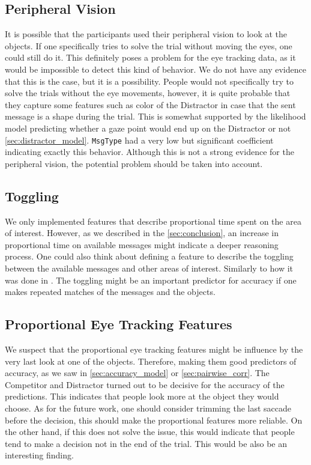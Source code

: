 \subsection{Peripheral Vision}
\label{sec:general-discussion:attention-and-eye-tracking}
It is possible that the participants used their peripheral vision to look at the objects. If one specifically tries to solve the trial without moving the eyes, one could still do it. This definitely poses a problem for the eye tracking data, as it would be impossible to detect this kind of behavior. We do not have any evidence that this is the case, but it is a possibility. People would not specifically try to solve the trials without the eye movements, however, it is quite probable that they capture some features such as color of the Distractor in case that the sent message is a shape during the trial. This is somewhat supported by the likelihood model predicting whether a gaze point would end up on the Distractor or not \autoref{sec:distractor_model}. \texttt{MsgType} had a very low but significant coefficient indicating exactly this behavior. Although this is not a strong evidence for the peripheral vision, the potential problem should be taken into account.


\subsection{Toggling}
\label{sec:general-discussion:toggling}
We only implemented features that describe proportional time spent on the area of interest. However, as we described in the \autoref{sec:conclusion}, an increase in proportional time on available messages might indicate a deeper reasoning process. One could also think about defining a feature to describe the toggling between the available messages and other areas of interest. Similarly to how it was done in \cite{Vigneau_2006}. The toggling might be an important predictor for accuracy if one makes repeated matches of the messages and the objects. 

\subsection{Proportional Eye Tracking Features}
\label{sec:general-discussion:proportional-eye-tracking-features}
We suspect that the proportional eye tracking features might be influence by the very last look at one of the objects. Therefore, making them good predictors of accuracy, as we saw in \autoref{sec:accuracy_model} or \autoref{sec:pairwise_corr}. The Competitor and Distractor turned out to be decisive for the accuracy of the predictions. This indicates that people look more at the object they would choose. As for the future work, one should consider trimming the last saccade before the decision, this should make the proportional features more reliable. On the other hand, if this does not solve the issue, this would indicate that people tend to make a decision not in the end of the trial. This would be also be an interesting finding.

